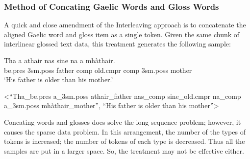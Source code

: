 \documentclass[final]{ua-thesis}
\numberwithin{equation}{section}
\begin{document}
\subsubsection{Method of Concating Gaelic Words and Gloss Words }\label{treatment:Concating}
A quick and close amendment of the Interleaving approach is to concatenate the aligned Gaelic word and gloss item as a single token. Given the same chunk of interlinear glossed text data, this treatment generates the following sample:

\begin{exe} 
\ex 
	\begin{xlist}
	\ex 
		\gll	 Tha a athair nas sine na a mh\`athair.\\  
     		     be.pres 3sm.poss father comp old.cmpr comp 3sm.poss mother \\
    	\glt    `His father is older than his mother.'  

    \ex <``Tha\_be.pres a\_3sm.poss athair\_father nas\_comp sine\_old.cmpr na\_comp a\_3sm.poss mh\`athair\_mother'', ``His father is older than his mother''>
    \end{xlist}
\end{exe}

Concating words and glosses does solve the long sequence problem; however, it causes the sparse data problem. In this arrangement, the number of the types of tokens is increased; the number of tokens of each type is decreased. Thus all the samples are put in a larger space. So, the treatment may not be effective either. 
\end{document}
